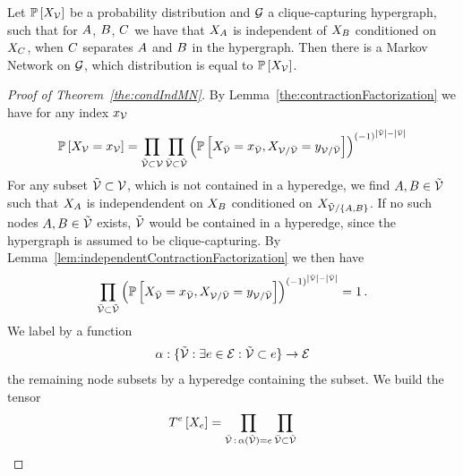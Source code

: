 \begin{theorem}
	Let $\mathbb{P}\left[X_{\mathcal{V}}\right]$ be a probability distribution and $\mathcal{G}$ a clique-capturing hypergraph, such that for $A$, $B$, $C$ we have that $X_{A}$ is independent of $X_{B}$ conditioned on $X_{C}$, when $C$ separates $A$ and $B$ in the hypergraph.
	Then there is a Markov Network on $\mathcal{G}$, which distribution is equal to $\mathbb{P}\left[X_{\mathcal{V}}\right]$.
\end{theorem}
\begin{proof}[Proof of Theorem~\ref{the:condIndMN}]
	By Lemma~\ref{the:contractionFactorization} we have for any index $x_{\mathcal{V}}$
	\begin{align*}
		\mathbb{P}\left[X_{\mathcal{V}}=x_{\mathcal{V}}\right] = 
		\prod_{\tilde{\mathcal{V}}\subset\mathcal{V}} \prod_{\bar{\mathcal{V}}\subset\tilde{\mathcal{V}}} 
		\left(
			\mathbb{P}\left[X_{\bar{\mathcal{V}}}=x_{\bar{\mathcal{V}}},X_{\mathcal{V}/\bar{\mathcal{V}}}=y_{\mathcal{V}/\bar{\mathcal{V}}}\right]
		\right)^{(-1)^{\left|\tilde{\mathcal{V}}\right|-\left|\bar{\mathcal{V}}\right|}}
	\end{align*}
	For any subset $\tilde{\mathcal{V}}\subset\mathcal{V}$, which is not contained in a hyperedge, we find $A,B \in\tilde{\mathcal{V}}$ such that $X_{A}$ is independendent on $X_{B}$ conditioned on $X_{\tilde{\mathcal{V}}/\{A,B\}}$.
	If no such nodes $A,B \in\tilde{\mathcal{V}}$ exists, $\tilde{\mathcal{V}}$ would be contained in a hyperedge, since the hypergraph is assumed to be clique-capturing.
	By Lemma~\ref{lem:independentContractionFactorization} we then have
	\begin{align*}
	 \prod_{\bar{\mathcal{V}}\subset\tilde{\mathcal{V}}} 
		\left(
			\mathbb{P}\left[X_{\bar{\mathcal{V}}}=x_{\bar{\mathcal{V}}},X_{\mathcal{V}/\bar{\mathcal{V}}}=y_{\mathcal{V}/\bar{\mathcal{V}}}\right]
		\right)^{(-1)^{\left|\tilde{\mathcal{V}}\right|-\left|\bar{\mathcal{V}}\right|}} = 1 \, .
	\end{align*}
	We label by a function 
	\begin{align*}
		\alpha: \{\tilde{\mathcal{V}} : \exists e\in\mathcal{E}: \tilde{\mathcal{V}} \subset e \} \rightarrow \mathcal{E}
	\end{align*}	
	the remaining node subsets by a hyperedge containing the subset.
	We build the tensor
	\begin{align*}
		\hypercoreofat{\edge}{\catvariableof{\edge}} = \prod_{\secnodes \, : \, \alpha(\secnodes) = \edge} \prod_{\thirdnodes\subset\secnodes} 

\end{align*}
\end{proof}
